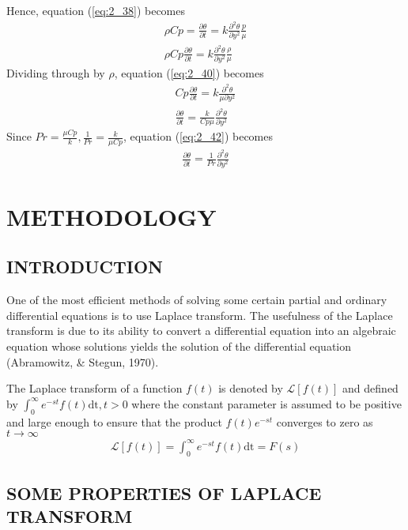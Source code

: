\documentclass[11pt]{report}
\newcommand{\sps}{\\[0.2cm]}
\newcommand{\refn}[1]{(\ref{#1})}
\newcommand{\refx}[1]{\refn{eq:#1}}
\newcommand{\NI}{\noindent}
\newcommand{\dsp}{\displaystyle}
\newcommand{\Laplace}{\mathcal{L}}
\newcommand{\ft}{f(t)}
\newcommand{\Fs}{F(s)}
\newcommand{\LaplaceIntegral}{\int_{0}^{\infty}e^{-st}\ft\text{dt}}
\newcommand{\sbracket}[1]{\left[#1\right]}
\newcommand{\LFt}{\Laplace \sbracket{\ft}}
\begin{document}
	Hence, equation \refx{2_38} becomes
	\begin{eqnarray}
		\rho Cp =\frac{\partial\theta}{\partial t} = k\frac{\partial^2 \theta}{\partial y^2}\frac{p}{\mu}\sps
		\rho Cp\frac{\partial\theta}{\partial t} = k\frac{\partial^2 \theta}{\partial y^2}\frac{\rho}{\mu}\label{eq:2_40}
	\end{eqnarray}
	Dividing through by $\rho$, equation \refx{2_40} becomes
	\begin{eqnarray}
			Cp\frac{\partial\theta}{\partial t} = k\frac{\partial^2 \theta}{\mu\partial y^2}\sps
			\frac{\partial\theta}{\partial t} = \frac{k}{Cp \mu}\frac{\partial^2 \theta}{\partial y^2}\label{eq:2_42}
	\end{eqnarray}
	Since $\dsp Pr = \frac{\mu Cp}{k}, \frac{1}{Pr} = \frac{k}{\mu Cp}$, equation \refx{2_42} becomes
	\begin{eqnarray}
		\frac{\partial\theta}{\partial t} = \frac{1}{Pr}\frac{\partial^2 \theta}{\partial y^2}\label{eq:2_43}
	\end{eqnarray}
	
	
	\chapter{METHODOLOGY}
	\section{INTRODUCTION}
	One of the most efficient methods of solving some certain partial and ordinary differential equations is to use Laplace transform. The usefulness of the Laplace transform is due to its ability to convert a differential equation into an algebraic equation whose solutions yields the solution of the differential equation (Abramowitz,  \& Stegun, 1970).
	
	\NI The Laplace transform of a function $\ft$ is denoted by $\LFt$ and defined by $\dsp \LaplaceIntegral, t > 0$ where the constant parameter is assumed to be positive and large enough to ensure that the product $\ft e^{-st}$ converges to zero as $t\rightarrow\infty$
	\begin{eqnarray}
		\LFt = \LaplaceIntegral = \Fs\label{eq:3_1}
	\end{eqnarray}
	
	\section{SOME PROPERTIES OF LAPLACE TRANSFORM}
\end{document}

